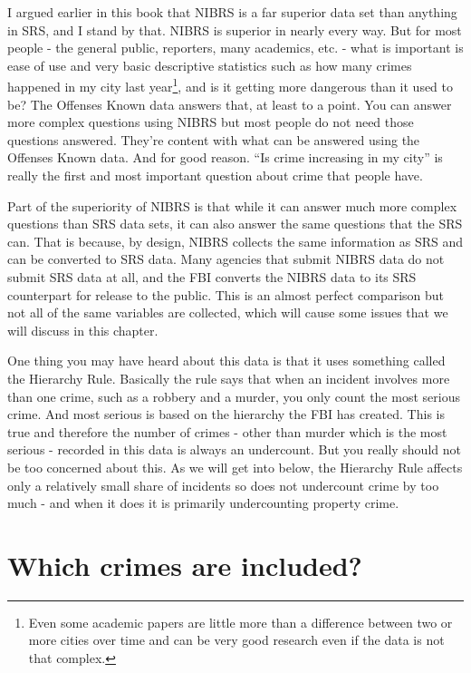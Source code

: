 \documentclass[
]{krantz}
\begin{document}
I argued earlier in this book that NIBRS is a far superior
data set than anything in SRS, and I stand by that. NIBRS is
superior in nearly every way. But for most people - the
general public, reporters, many academics, etc. - what is
important is ease of use and very basic descriptive
statistics such as how many crimes happened in my city last
year\footnote{Even some academic papers are little more than
  a difference between two or more cities over time and can
  be very good research even if the data is not that
  complex.}, and is it getting more dangerous than it used
to be? The Offenses Known data answers that, at least to a
point. You can answer more complex questions using NIBRS but
most people do not need those questions answered. They're
content with what can be answered using the Offenses Known
data. And for good reason. ``Is crime increasing in my
city'' is really the first and most important question about
crime that people have.

Part of the superiority of NIBRS is that while it can answer
much more complex questions than SRS data sets, it can also
answer the same questions that the SRS can. That is because,
by design, NIBRS collects the same information as SRS and
can be converted to SRS data. Many agencies that submit
NIBRS data do not submit SRS data at all, and the FBI
converts the NIBRS data to its SRS counterpart for release
to the public. This is an almost perfect comparison but not
all of the same variables are collected, which will cause
some issues that we will discuss in this chapter.

One thing you may have heard about this data is that it uses
something called the Hierarchy Rule. Basically the rule says
that when an incident involves more than one crime, such as
a robbery and a murder, you only count the most serious
crime. And most serious is based on the hierarchy the FBI
has created. This is true and therefore the number of crimes
- other than murder which is the most serious - recorded in
this data is always an undercount. But you really should not
be too concerned about this. As we will get into below, the
Hierarchy Rule affects only a relatively small share of
incidents so does not undercount crime by too much - and
when it does it is primarily undercounting property crime.

\section{Which crimes are
included?}\label{indexCrimesOffensesKnown}
\end{document}

